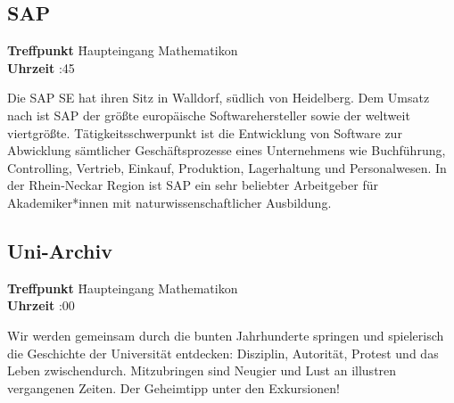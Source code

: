 \hochruecken
\subsection*{SAP}
\begin{tabbing}
\textbf{Treffpunkt} \quad \quad \quad \= Haupteingang Mathematikon\\
\textbf{Uhrzeit} :45
\end{tabbing}
\hochruecken
Die SAP SE hat ihren Sitz in Walldorf, südlich von Heidelberg. Dem Umsatz nach ist SAP der größte europäische Softwarehersteller sowie der weltweit viertgrößte. Tätigkeitsschwerpunkt ist die Entwicklung von Software zur Abwicklung sämtlicher Geschäftsprozesse eines Unternehmens wie Buchführung, Controlling, Vertrieb, Einkauf, Produktion, Lagerhaltung und Personalwesen. In der Rhein-Neckar Region ist SAP ein sehr beliebter Arbeitgeber für Akademiker*innen mit naturwissenschaftlicher Ausbildung. 

\hochruecken
\subsection*{Uni-Archiv}
\begin{tabbing}
\textbf{Treffpunkt} \quad \quad \quad \= Haupteingang Mathematikon\\
\textbf{Uhrzeit} :00
\end{tabbing}
\hochruecken
Wir werden gemeinsam durch die bunten Jahrhunderte springen und \glqq spielerisch\grqq{} die Geschichte der Universität entdecken: Disziplin, Autorität, Protest und das Leben zwischendurch. Mitzubringen sind Neugier und Lust an illustren vergangenen Zeiten. Der Geheimtipp unter den Exkursionen! 

\hochruecken
